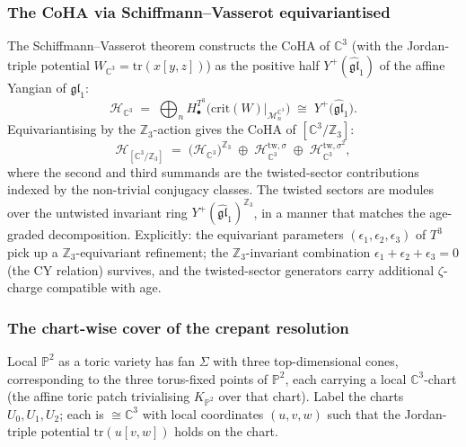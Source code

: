 \subsubsection{The CoHA via Schiffmann--Vasserot equivariantised}
\label{subsec:SV-equivariantised}

The Schiffmann--Vasserot theorem constructs the CoHA of $\mathbb{C}^3$ (with the Jordan-triple potential $W_{\mathbb{C}^3} = \mathrm{tr}(x[y,z])$) as the positive half $Y^+(\widehat{\mathfrak{gl}}_1)$ of the affine Yangian of $\mathfrak{gl}_1$:
\[
\mathcal{H}_{\mathbb{C}^3} \;=\; \bigoplus_n H^{T^3}_\bullet\bigl(\mathrm{crit}(W)|_{\mathcal{M}_n^{\mathbb{C}^3}}\bigr) \;\cong\; Y^+\bigl(\widehat{\mathfrak{gl}}_1\bigr).
\]
Equivariantising by the $\mathbb{Z}_3$-action gives the CoHA of $[\mathbb{C}^3/\mathbb{Z}_3]$:
\[
\mathcal{H}_{[\mathbb{C}^3/\mathbb{Z}_3]} \;=\; \bigl(\mathcal{H}_{\mathbb{C}^3}\bigr)^{\mathbb{Z}_3} \;\oplus\; \mathcal{H}_{\mathbb{C}^3}^{\mathrm{tw}, \sigma} \;\oplus\; \mathcal{H}_{\mathbb{C}^3}^{\mathrm{tw}, \sigma^2},
\]
where the second and third summands are the twisted-sector contributions indexed by the non-trivial conjugacy classes. The twisted sectors are modules over the untwisted invariant ring $Y^+(\widehat{\mathfrak{gl}}_1)^{\mathbb{Z}_3}$, in a manner that matches the age-graded decomposition. Explicitly: the equivariant parameters $(\epsilon_1, \epsilon_2, \epsilon_3)$ of $T^3$ pick up a $\mathbb{Z}_3$-equivariant refinement; the $\mathbb{Z}_3$-invariant combination $\epsilon_1 + \epsilon_2 + \epsilon_3 = 0$ (the CY relation) survives, and the twisted-sector generators carry additional $\zeta$-charge compatible with age.

\subsubsection{The chart-wise cover of the crepant resolution}
\label{subsec:chartwise-crepant}

Local $\mathbb{P}^2$ as a toric variety has fan $\Sigma$ with three top-dimensional cones, corresponding to the three torus-fixed points of $\mathbb{P}^2$, each carrying a local $\mathbb{C}^3$-chart (the affine toric patch trivialising $K_{\mathbb{P}^2}$ over that chart). Label the charts $U_0, U_1, U_2$; each is $\cong \mathbb{C}^3$ with local coordinates $(u, v, w)$ such that the Jordan-triple potential $\mathrm{tr}(u[v,w])$ holds on the chart.


